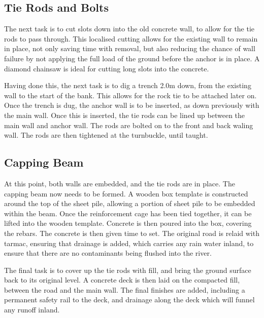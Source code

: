 \documentclass[12pt, a4paper]{article}
\begin{document}
\subsection{Tie Rods and Bolts}
The next task is to cut slots down into the old concrete wall, to allow for the tie rods to pass through. This localised cutting allows for the existing wall to remain in place, not only saving time with removal, but also reducing the chance of wall failure by not applying the full load of the ground before the anchor is in place. A diamond chainsaw is ideal for cutting long slots into the concrete. 
\begin{justify}
Having done this, the next task is to dig a trench 2.0m down, from the existing wall to the start of the bank. This allows for the rock tie to be attached later on. Once the trench is dug, the anchor wall is to be inserted, as down previously with the main wall. Once this is inserted, the tie rods can be lined up between the main wall and anchor wall. The rods are bolted on to the front and back waling wall. The rods are then tightened at the turnbuckle, until taught.
\end{justify}
\subsection{Capping Beam}
\begin{justify}
At this point, both walls are embedded, and the tie rods are in place. The capping beam now needs to be formed. A wooden box template is constructed around the top of the sheet pile, allowing a portion of sheet pile to be embedded within the beam. Once the reinforcement cage has been tied together, it can be lifted into the wooden template. Concrete is then poured into the box, covering the rebars. The concrete is then given time to set. The original road is relaid with tarmac, ensuring that drainage is added, which carries any rain water inland, to ensure that there are no contaminants being flushed into the river.
\end{justify}
\begin{justify}
The final task is to cover up the tie rods with fill, and bring the ground surface back to its original level. A concrete deck is then laid on the compacted fill, between the road and the main wall. The final finishes are added, including a permanent safety rail to the deck, and drainage along the deck which will funnel any runoff inland.
\end{justify}
\end{document}
